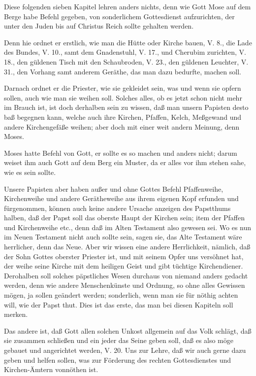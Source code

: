 Diese folgenden sieben Kapitel lehren anders nichts, denn wie Gott Mose auf dem Berge habe Befehl gegeben, von sonderlichem Gottesdienst aufzurichten, der unter den Juden bis auf Christus Reich sollte gehalten werden.

Denn hie ordnet er erstlich, wie man die Hütte oder Kirche bauen, V. 8., die Lade des Bundes, V. 10., samt dem Gnadenstuhl, V. 17., und Cherubim zurichten, V. 18., den güldenen Tisch mit den Schaubroden, V. 23., den güldenen Leuchter, V. 31., den Vorhang samt anderem Geräthe, das man dazu bedurfte, machen soll.

Darnach ordnet er die Priester, wie sie gekleidet sein, was und wenn sie opfern sollen, auch wie man sie weihen soll. Solches alles, ob es jetzt schon nicht mehr im Brauch ist, ist doch derhalben sein zu wissen, daß man unsern Papisten desto baß begegnen kann, welche auch ihre Kirchen, Pfaffen, Kelch, Meßgewand und andere Kirchengefäße weihen; aber doch mit einer weit andern Meinung, denn Moses.

Moses hatte Befehl von Gott, er sollte es so machen und anders nicht; darum weiset ihm auch Gott auf dem Berg ein Muster, da er alles vor ihm stehen sahe, wie es sein sollte.

Unsere Papisten aber haben außer und ohne Gottes Befehl Pfaffenweihe, Kirchenweihe und andere Gerätheweihe aus ihrem eigenen Kopf erfunden und fürgenommen, können auch keine andere Ursache anzeigen des Papstthums halben, daß der Papst soll das oberste Haupt der Kirchen sein; item der Pfaffen und Kirchenweihe etc., denn daß im Alten Testament also gewesen sei. Wo es nun im Neuen Testament nicht auch sollte sein, sagen sie, das Alte Testament wäre herrlicher, denn das Neue. Aber wir wissen eine andere Herrlichkeit, nämlich, daß der Sohn Gottes oberster Priester ist, und mit seinem Opfer uns versöhnet hat, der weihe seine Kirche mit dem heiligen Geist und gibt tüchtige Kirchendiener. Derohalben soll solches päpstliches Wesen durchaus von niemand anders gedacht werden, denn wie andere Menschenkünste und Ordnung, so ohne alles Gewissen mögen, ja sollen geändert werden; sonderlich, wenn man sie für nöthig achten will, wie der Papst thut. Dies ist das erste, das man bei diesen Kapiteln soll merken.

Das andere ist, daß Gott allen solchen Unkost allgemein auf das Volk schlägt, daß sie zusammen schließen und ein jeder das Seine geben soll, daß es also möge gebauet und angerichtet werden, V. 20. Uns zur Lehre, daß wir auch gerne dazu geben und helfen sollen, was zur Förderung des rechten Gottesdienstes und Kirchen-Ämtern vonnöthen ist.

